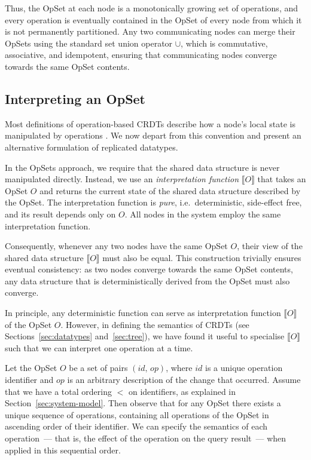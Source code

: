 Thus, the OpSet at each node is a monotonically growing set of operations, and every operation is eventually contained in the OpSet of every node from which it is not permanently partitioned.
Any two communicating nodes can merge their OpSets using the standard set union operator $\cup$, which is commutative, associative, and idempotent, ensuring that communicating nodes converge towards the same OpSet contents.

\subsection{Interpreting an OpSet}\label{sec:op-serial}

Most definitions of operation-based CRDTs describe how a node's local state is manipulated by operations \cite{Shapiro:2011wy,Shapiro:2011un}.
We now depart from this convention and present an alternative formulation of replicated datatypes.

In the OpSets approach, we require that the shared data structure is never manipulated directly.
Instead, we use an \emph{interpretation function} $\llbracket O \rrbracket$ that takes an OpSet $O$ and returns the current state of the shared data structure described by the OpSet.
The interpretation function is \emph{pure}, i.e.\ deterministic, side-effect free, and its result depends only on $O$.
All nodes in the system employ the same interpretation function.

Consequently, whenever any two nodes have the same OpSet $O$, their view of the shared data structure $\llbracket O \rrbracket$ must also be equal.
This construction trivially ensures eventual consistency: as two nodes converge towards the same OpSet contents, any data structure that is deterministically derived from the OpSet must also converge.

In principle, any deterministic function can serve as interpretation function $\llbracket O \rrbracket$ of the OpSet $O$.
However, in defining the semantics of CRDTs (see Sections~\ref{sec:datatypes} and~\ref{sec:tree}), we have found it useful to specialise $\llbracket O \rrbracket$ such that we can interpret one operation at a time.

Let the OpSet $O$ be a set of pairs $(\mathit{id},\, \mathit{op})$, where $\mathit{id}$ is a unique operation identifier and $\mathit{op}$ is an arbitrary description of the change that occurred.
Assume that we have a total ordering $<$ on identifiers, as explained in Section~\ref{sec:system-model}.
Then observe that for any OpSet there exists a unique sequence of operations, containing all operations of the OpSet in ascending order of their identifier.
We can specify the semantics of each operation~--- that is, the effect of the operation on the query result~--- when applied in this sequential order.

